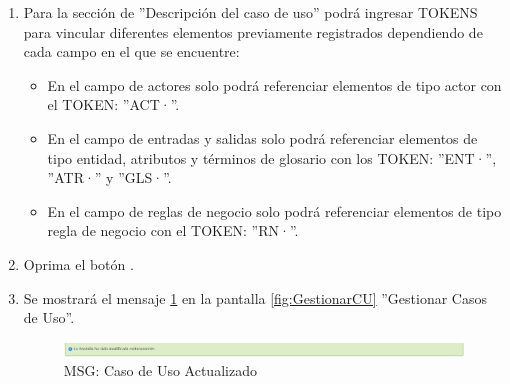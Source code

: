 \begin{enumerate}
			\item Para la sección de ''Descripción del caso de uso'' podrá ingresar TOKENS para vincular diferentes elementos previamente registrados dependiendo de cada campo en el que se encuentre:
			
			\begin{itemize}
				\item En el campo de actores solo podrá referenciar elementos de tipo actor con el TOKEN: ''ACT·''.
				\item En el campo de entradas y salidas solo podrá referenciar elementos de tipo entidad, atributos y términos de glosario con los TOKEN: ''ENT·'', ''ATR·'' y ''GLS·''.
				\item En el campo de reglas de negocio solo podrá referenciar elementos de tipo regla de negocio con el TOKEN: ''RN·''.
			\end{itemize}
						
			\item Oprima el botón \IUAceptar.
			
			\item Se mostrará el mensaje \ref{fig:CUModificado} en la pantalla \ref{fig:GestionarCU} ''Gestionar Casos de Uso''.
			
			\begin{figure}[htbp!]
				\begin{center}
					\includegraphics[scale=0.5]{roles/lider/casosUso/pantallas/IU11-2MSG1}
					\caption{MSG: Caso de Uso Actualizado}
					\label{fig:CUModificado}
				\end{center}
			\end{figure}
			\end{enumerate}